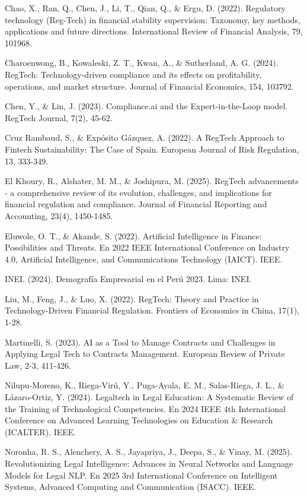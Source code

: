 \documentclass[12pt,a4paper,oneside]{report}
\begin{document}
Chao, X., Ran, Q., Chen, J., Li, T., Qian, Q., \& Ergu, D. (2022).
Regulatory technology (Reg-Tech) in financial stability supervision:
Taxonomy, key methods, applications and future directions. International
Review of Financial Analysis, 79, 101968.

Charoenwong, B., Kowaleski, Z. T., Kwan, A., \& Sutherland, A. G.
(2024). RegTech: Technology-driven compliance and its effects on
profitability, operations, and market structure. Journal of Financial
Economics, 154, 103792.

Chen, Y., \& Lin, J. (2023). Compliance.ai and the Expert-in-the-Loop
model. RegTech Journal, 7(2), 45-62.

Cruz Rambaud, S., \& Expósito Gázquez, A. (2022). A RegTech Approach to
Fintech Sustainability: The Case of Spain. European Journal of Risk
Regulation, 13, 333-349.

El Khoury, R., Alshater, M. M., \& Joshipura, M. (2025). RegTech
advancements - a comprehensive review of its evolution, challenges, and
implications for financial regulation and compliance. Journal of
Financial Reporting and Accounting, 23(4), 1450-1485.

Eluwole, O. T., \& Akande, S. (2022). Artificial Intelligence in
Finance: Possibilities and Threats. En 2022 IEEE International
Conference on Industry 4.0, Artificial Intelligence, and Communications
Technology (IAICT). IEEE.

INEI. (2024). Demografía Empresarial en el Perú 2023. Lima: INEI.

Liu, M., Feng, J., \& Luo, X. (2022). RegTech: Theory and Practice in
Technology-Driven Financial Regulation. Frontiers of Economics in China,
17(1), 1-28.

Martinelli, S. (2023). AI as a Tool to Manage Contracts and Challenges
in Applying Legal Tech to Contracts Management. European Review of
Private Law, 2-3, 411-426.

Nilupu-Moreno, K., Riega-Virú, Y., Puga-Ayala, E. M., Salas-Riega, J.
L., \& Lázaro-Ortiz, Y. (2024). Legaltech in Legal Education: A
Systematic Review of the Training of Technological Competencies. En 2024
IEEE 4th International Conference on Advanced Learning Technologies on
Education \& Research (ICALTER). IEEE.

Noronha, R. S., Alenchery, A. S., Jayapriya, J., Deepa, S., \& Vinay, M.
(2025). Revolutionizing Legal Intelligence: Advances in Neural Networks
and Language Models for Legal NLP. En 2025 3rd International Conference
on Intelligent Systems, Advanced Computing and Communication (ISACC).
IEEE.
\end{document}
